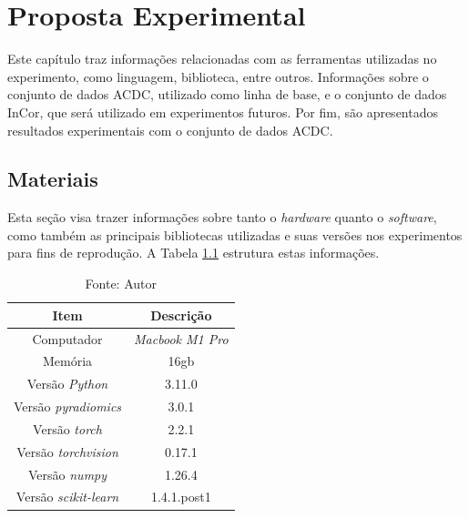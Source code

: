 \chapter{Proposta Experimental}
\label{chap:proposta_experimental}

Este capítulo traz informações relacionadas com as ferramentas utilizadas no experimento, como linguagem, biblioteca, entre outros. Informações sobre o conjunto de dados \gls{ACDC}, utilizado como linha de base, e o conjunto de dados \gls{InCor}, que será utilizado em experimentos futuros. Por fim, são apresentados resultados experimentais com o conjunto de dados \gls{ACDC}. 

\section{Materiais} 
\label{sec:cap5_materiais}

Esta seção visa trazer informações sobre tanto o \textit{hardware} quanto o \textit{software}, como também as principais bibliotecas utilizadas e suas versões nos experimentos para fins de reprodução. A Tabela \ref{tab:hardware_software} estrutura estas informações.

\begin{table}[hbtp]
    \centering
    \renewcommand{\arraystretch}{1} %
    \begin{tabular}{|c|c|}
    \hline 
       \textbf{Item} & \textbf{Descrição}\\
    \hline 
       Computador & \textit{Macbook M1 Pro}  \\
    \hline 
       Memória & 16gb  \\
    \hline 
       Versão \textit{Python} & 3.11.0  \\
    \hline 
       Versão \textit{pyradiomics} & 3.0.1 \\
    \hline 
       Versão \textit{torch} & 2.2.1 \\
    \hline 
       Versão \textit{torchvision} & 0.17.1 \\
    \hline 
       Versão \textit{numpy} & 1.26.4 \\
    \hline 
       Versão \textit{scikit-learn} & 1.4.1.post1 \\
    \hline 
    \end{tabular} 
    \caption{Fonte: Autor}
    \label{tab:hardware_software}
\end{table}

